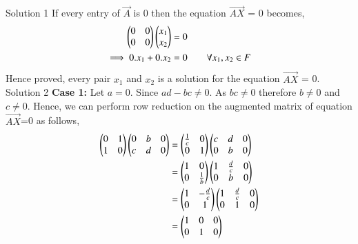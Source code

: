 {Solution 1}
If every entry of $\vec{A}$ is 0 then the equation $\vec{AX}$ = 0 becomes,
\begin{align}
\begin{pmatrix}0&0\\0&0\end{pmatrix}\begin{pmatrix}x_1\\x_2\end{pmatrix} &=0\\
\implies0.x_1+0.x_2 &= 0 \qquad{\text{$\forall x_1,x_2 \in F$}}
\end{align}
Hence proved, every pair $x_1$ and $x_2$ is a solution for the equation $\vec{AX}$ = 0.
{Solution 2}
\textbf{Case 1: }Let $a=0$. Since $ad-bc\not=0$. As $bc\not=0$ therefore $b\not=0$ and $c\not=0$. Hence, we can perform row reduction on the augmented matrix of equation $\vec{AX}$=0 as follows,
\begin{align}
\begin{pmatrix}0&1\\1&0\end{pmatrix}\begin{pmatrix}0&b&0\\c&d&0\end{pmatrix} &= \begin{pmatrix}\frac{1}{c}&0\\0&1\end{pmatrix}\begin{pmatrix}c&d&0\\0&b&0\end{pmatrix}\\
&=\begin{pmatrix}1&0\\0&\frac{1}{b}\end{pmatrix}\begin{pmatrix}1&\frac{d}{c}&0\\0&b&0\end{pmatrix}\\
&=\begin{pmatrix}1&-\frac{d}{c}\\0&1\end{pmatrix}\begin{pmatrix}1&\frac{d}{c}&0\\0&1&0\end{pmatrix}\\
&=\begin{pmatrix}1&0&0\\0&1&0\end{pmatrix}\label{eq:solutions/1/2/8/eqI1}
\end{align}
